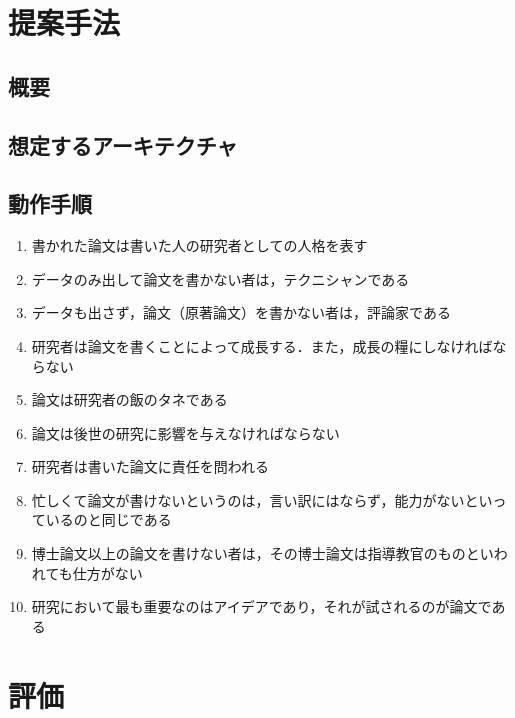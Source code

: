 \documentclass[a4paper,10pt,twocolumn,uplatex]{jsarticle}
\begin{document}
\section{提案手法}

\subsection{概要}

\subsection{想定するアーキテクチャ}

\subsection{動作手順}

\begin{enumerate} %
  \item 書かれた論文は書いた人の研究者としての人格を表す
  \item データのみ出して論文を書かない者は，テクニシャンである
  \item データも出さず，論文（原著論文）を書かない者は，評論家である
  \item 研究者は論文を書くことによって成長する．また，成長の糧にしなければならない
  \item 論文は研究者の飯のタネである
  \item 論文は後世の研究に影響を与えなければならない
  \item 研究者は書いた論文に責任を問われる
  \item 忙しくて論文が書けないというのは，言い訳にはならず，能力がないといっているのと同じである
  \item 博士論文以上の論文を書けない者は，その博士論文は指導教官のものといわれても仕方がない
  \item 研究において最も重要なのはアイデアであり，それが試されるのが論文である
\end{enumerate}

\section{評価}

\end{document}

